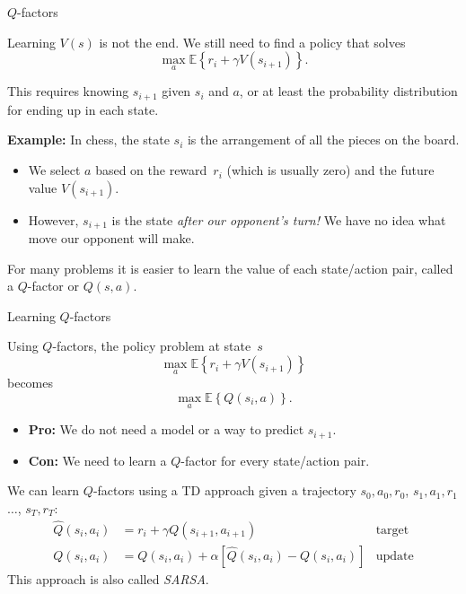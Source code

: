\documentclass[9pt]{beamer}
\newcommand\pskip{\pause\bigskip}
\begin{document}
\begin{frame}{$Q$-factors}

Learning $V(s)$ is not the end. We still need to find a policy that solves
	\[ \max_{a} \mathbb{E}\left\{ r_i + \gamma V(s_{i+1}) \right\}. \]

This requires knowing $s_{i+1}$ given $s_i$ and $a$, or at least the probability distribution for ending up in each state.

\pskip
\textbf{Example:} In chess, the state $s_i$ is the arrangement of all the pieces on the board.
\begin{itemize}
	\item We select $a$ based on the reward~$r_i$ (which is usually zero) and the future value $V(s_{i+1})$.
	\item However, $s_{i+1}$ is the state \emph{after our opponent's turn!} We have no idea what move our opponent will make.
\end{itemize}

\pskip
For many problems it is easier to learn the value of each state/action pair, called a $Q$-factor or $Q(s,a)$.

\end{frame}

\begin{frame}{Learning $Q$-factors}

Using $Q$-factors, the policy problem at state~$s$
	\[ \max_{a} \mathbb{E}\left\{ r_i + \gamma V(s_{i+1}) \right\} \]
becomes
	\[ \max_{a} \mathbb{E}\left\{ Q(s_i,a) \right\}. \]

\pskip
\begin{itemize}
	\item \textbf{Pro:} We do not need a model or a way to predict $s_{i+1}$.
	\item \textbf{Con:} We need to learn a $Q$-factor for every state/action pair.
\end{itemize}

\pskip
We can learn $Q$-factors using a TD approach given a trajectory $s_0,a_0,r_0$, $s_1,a_1,r_1$ $\ldots$, $s_T,r_T$:
\begin{align*}
	\hat{Q}(s_i,a_i) &= r_i + \gamma Q(s_{i+1},a_{i+1}) & \text{target} \\
	Q(s_i,a_i) &= Q(s_i,a_i) + \alpha\left[ \hat{Q}(s_i,a_i) - Q(s_i,a_i) \right] & \text{update}
\end{align*}
\pause
This approach is also called \emph{SARSA}.

\end{frame}
\end{document}
